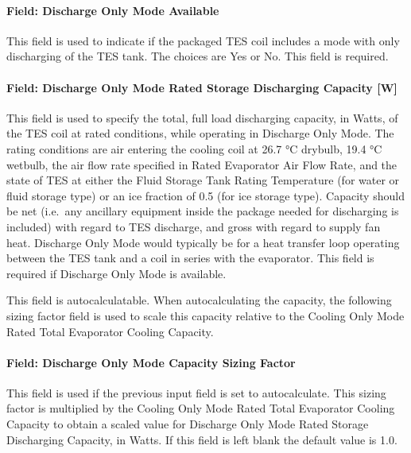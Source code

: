\paragraph{Field: Discharge Only Mode Available}\label{field-discharge-only-mode-available}

This field is used to indicate if the packaged TES coil includes a mode with only discharging of the TES tank. The choices are Yes or No. This field is required.

\paragraph{Field: Discharge Only Mode Rated Storage Discharging Capacity {[}W{]}}\label{field-discharge-only-mode-rated-storage-discharging-capacity-w}

This field is used to specify the total, full load discharging capacity, in Watts, of the TES coil at rated conditions, while operating in Discharge Only Mode. The rating conditions are air entering the cooling coil at 26.7 °C drybulb, 19.4 °C wetbulb, the air flow rate specified in Rated Evaporator Air Flow Rate, and the state of TES at either the Fluid Storage Tank Rating Temperature (for water or fluid storage type) or an ice fraction of 0.5 (for ice storage type). Capacity should be net (i.e.~any ancillary equipment inside the package needed for discharging is included) with regard to TES discharge, and gross with regard to supply fan heat. Discharge Only Mode would typically be for a heat transfer loop operating between the TES tank and a coil in series with the evaporator. This field is required if Discharge Only Mode is available.

This field is autocalculatable. When autocalculating the capacity, the following sizing factor field is used to scale this capacity relative to the Cooling Only Mode Rated Total Evaporator Cooling Capacity.

\paragraph{Field: Discharge Only Mode Capacity Sizing Factor}\label{field-discharge-only-mode-capacity-sizing-factor}

This field is used if the previous input field is set to autocalculate. This sizing factor is multiplied by the Cooling Only Mode Rated Total Evaporator Cooling Capacity to obtain a scaled value for Discharge Only Mode Rated Storage Discharging Capacity, in Watts. If this field is left blank the default value is 1.0.

